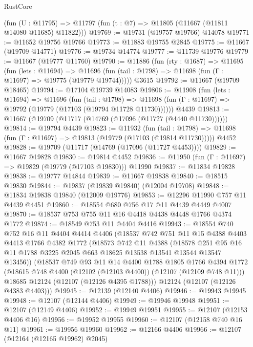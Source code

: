 \begin{lexlean}{RustCore}
\begin{coremodule}
    (fun (U : @11795) => @11797 (fun (t : @7) => @11805 (@11667 (@11811 @14080 @11685) @11822)))
@19769 := @19731 (@19757 @19766) @14078
@19771 := @11652 @19756 @19766
@19773 := @11883 @19755 @2845
@19775 := @11667 (@19709 @14771)
@19776 := @19734 @14774
@19777 := @11739 @19776
@19779 := @11667 (@19777 @11760)
@19790 := @11886
    (fun (rty : @1687) =>
    @11695
      (fun (lets : @11694) =>
      @11696 (fun (tail : @1798) => @11698 (fun (Γ : @11697) => @19775 (@19779 @19744)))))
    @3615
@19792 := @11667 (@19709 @18465)
@19794 := @17104 @19739 @14083
@19806 := @11908
    (fun (lets : @11694) =>
    @11696
      (fun (tail : @1798) =>
      @11698 (fun (Γ : @11697) => @19792 (@19779 (@17103 (@19794 @11728 @11730))))))
    @4439
@19813 := @11667 (@19709 (@11717 (@14769 (@17096 (@11727 (@4440 @11730))))))
@19814 := @19794 @4439
@19823 := @11932
    (fun (tail : @1798) => @11698 (fun (Γ : @11697) => @19813 (@19779 (@17103 (@19814 @11730)))))
    @4452
@19828 := @19709 (@11717 (@14769 (@17096 (@11727 @4453))))
@19829 := @11667 @19828
@19830 := @19814 @4452
@19836 := @11950 (fun (Γ : @11697) => @19829 (@19779 (@17103 @19830))) @11990
@19837 := @11834 @19828
@19838 := @19777 @14844
@19839 := @11667 @19838
@19840 := @18515 @19830
@19844 := @19837 (@19839 @19840) (@12004 @19708)
@19848 := @11834 @19838 @19840 (@12009 @19776)
@19853 := @12296 @11990 @757 @11 @4439 @4451
@19860 := @18554 @680 @756 @17 @11 @4439 @4449 @4007
@19870 := @18537 @753 @755 @11 @16 @4418 @4438 @4448 @1766 @4374 @1772
@19874 := @18549 @753 @11 @4404 @4416
@19943 := @18554
    @740
    @752
    @16
    @11
    @4404
    @4414
    @4406
    (@18537
      @742
      @751
      @11
      @15
      @4388
      @4403
      @4413
      @1766
      @4382
      @1772
      (@18573
        @742
        @11
        @4388
        (@18578 @251 @95 @16 @11 @1788 @3225 @2045 @663 @18625 @13538 @13541 @13544 @13547 @13456))
      (@18537
        @749
        @93
        @11
        @14
        @4400
        @1788
        @1805
        @1766
        @4394
        @1772
        (@18615 @748 @4400 (@12102 (@12103 @4400)) (@12107 (@12109 @748 @11)))
        @18685
        @12124
        (@12107 (@12126 @4395 @1788)))
      @12124
      (@12107 (@12126 @4383 @4403)))
@19945 := @12139 (@12140 @4406)
@19946 := @19943 @19945
@19948 := @12107 (@12144 @4406)
@19949 := @19946 @19948
@19951 := @12107 (@12149 @4406)
@19952 := @19949 @19951
@19955 := @12107 (@12153 @4406 @16)
@19956 := @19952 @19955
@19960 := @12107 (@12158 @740 @16 @11)
@19961 := @19956 @19960
@19962 := @12166 @4406
@19966 := @12107 (@12164 (@12165 @19962) @2045)

\end{coremodule}
\end{lexlean}
